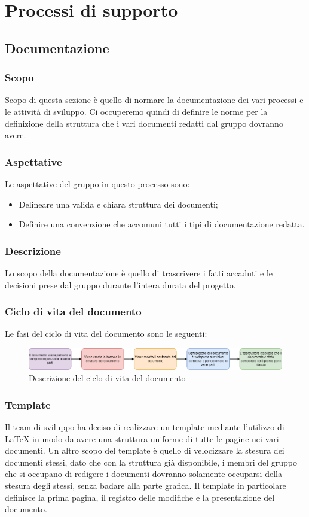 \section{Processi di supporto}\label{section:processi_supporto}
\subsection{Documentazione}\label{subsection: documentazione}
\subsubsection{Scopo}\label{subsubsection: scopo}
Scopo di questa sezione è quello di normare la documentazione dei vari processi e le attività di sviluppo.
Ci occuperemo quindi di definire le norme per la definizione della struttura che i vari documenti redatti dal gruppo \groupName{} dovranno avere.
\subsubsection{Aspettative}
Le aspettative del gruppo \groupName{} in questo processo sono:
\begin{itemize}
\item Delineare una valida e chiara struttura dei documenti;
\item Definire una convenzione che accomuni tutti i tipi di documentazione redatta.
\end {itemize}
\subsubsection{Descrizione}
Lo scopo della documentazione è quello di trascrivere i fatti accaduti e le decisioni prese dal gruppo durante l'intera durata del progetto.
\subsubsection{Ciclo di vita del documento}
Le fasi del ciclo di vita\glo{} del documento sono le seguenti:
\begin{figure}[htbp]
\centering
\includegraphics[scale = 0.5]{../template/images/NdP/CicloDiVitaDocumento.png}
\caption{Descrizione del ciclo di vita del documento}
\end {figure}
\subsubsection{Template}
Il team di sviluppo ha deciso di realizzare un template mediante l'utilizzo di \LaTeX{} in modo da avere una struttura uniforme di tutte le pagine nei vari documenti.
Un altro scopo del template è quello di velocizzare la stesura dei documenti stessi, dato che con la struttura già disponibile, i membri del gruppo che si occupano di redigere i documenti dovranno solamente occuparsi della stesura degli stessi, senza badare alla parte grafica.
Il template in particolare definisce la prima pagina, il registro delle modifiche e la presentazione del documento.
